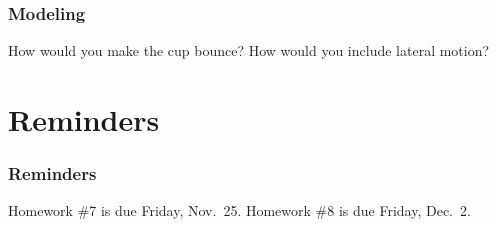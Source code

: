 \documentclass[11pt]{beamer}
\begin{document}
\begin{frame}[fragile]
  \frametitle{Modeling}
  \Enlarge

  \begin{enumerate}
  \myitem  How would you make the cup bounce? %
  \myitem  How would you include lateral motion? %
  \end{enumerate}
\end{frame}

\section{Reminders}

\begin{frame}
  \frametitle{Reminders}
  \Enlarge

  \begin{itemize}
  \myitem  Homework \#7 is due Friday, Nov.\ 25.
  \myitem  Homework \#8 is due Friday, Dec.\ 2.
  \end{itemize}
\end{frame}
\end{document}
